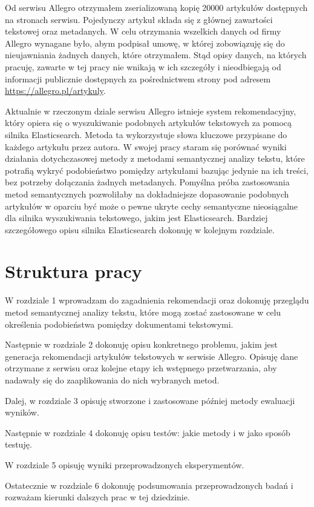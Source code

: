 \documentclass[pl]{minipw} %
\begin{document}
Od serwisu Allegro otrzymałem zserializowaną kopię 20000 artykułów dostępnych na stronach serwisu. Pojedynczy artykuł składa się z głównej zawartości tekstowej oraz metadanych. W celu otrzymania wszelkich danych od firmy Allegro wynagane było, abym podpisał umowę, w której zobowiązuję się do nieujawniania żadnych danych, które otrzymałem. Stąd opisy danych, na których pracuję, zawarte w tej pracy nie wnikają w ich szczegóły i nieodbiegają od informacji publicznie dostępnych za pośrednictwem strony pod adresem \url{https://allegro.pl/artykuly}.

Aktualnie w rzeczonym dziale serwisu Allegro istnieje system rekomendacyjny, który opiera się o wyszukiwanie podobnych artykułów tekstowych za pomocą silnika Elasticsearch\cite{elastic}. Metoda ta wykorzystuje słowa kluczowe przypisane do każdego artykułu przez autora. W swojej pracy staram się porównać wyniki działania dotychczasowej metody z metodami semantycznej analizy tekstu, które potrafią wykryć podobieństwo pomiędzy artykułami bazując jedynie na ich treści, bez potrzeby dołączania żadnych metadanych. Pomyślna próba zastosowania metod semantycznych pozwoliłaby na dokładniejsze dopasowanie podobnych artykułów w oparciu być może o pewne ukryte cechy semantyczne nieosiągalne dla silnika wyszukiwania tekstowego, jakim jest Elasticsearch. Bardziej szczegółowego opisu silnika Elasticsearch dokonuję w kolejnym rozdziale.

\section{Struktura pracy}
W rozdziale 1 wprowadzam do zagadnienia rekomendacji oraz dokonuję przeglądu metod semantycznej analizy tekstu, które mogą zostać zastosowane w celu określenia podobieństwa pomiędzy dokumentami tekstowymi.

Następnie w rozdziale 2 dokonuję opisu konkretnego problemu, jakim jest generacja rekomendacji artykułów tekstowych w serwisie Allegro. Opisuję dane otrzymane z serwisu oraz kolejne etapy ich wstępnego przetwarzania, aby nadawały się do zaaplikowania do nich wybranych metod.

Dalej, w rozdziale 3 opisuję stworzone i zastosowane później metody ewaluacji wyników.

Następnie w rozdziale 4 dokonuję opisu testów: jakie metody i w jako sposób testuję.

W rozdziale 5 opisuję wyniki przeprowadzonych eksperymentów.

Ostatecznie w rozdziale 6 dokonuję podsumowania przeprowadzonych badań i rozważam kierunki dalszych prac w tej dziedzinie.
\end{document}
